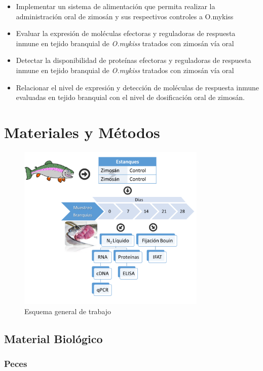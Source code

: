 \documentclass[12pt,a4paper,]{article}
\begin{document}
\begin{itemize}
\itemsep1pt\parskip0pt
\item
  Implementar un sistema de alimentación que permita realizar la
  administración oral de zimosán y sus respectivos controles a O.mykiss
\item
  Evaluar la expresión de moléculas efectoras y reguladoras de respuesta
  inmune en tejido branquial de \emph{O.mykiss} tratados con zimosán vía
  oral
\item
  Detectar la disponibilidad de proteínas efectoras y reguladoras de
  respuesta inmune en tejido branquial de \emph{O.mykiss} tratados con
  zimosán vía oral
\item
  Relacionar el nivel de expresión y detección de moléculas de respuesta
  inmune evaluadas en tejido branquial con el nivel de dosificación oral
  de zimosán.
\end{itemize}

\clearpage

\section{Materiales y Métodos}\label{materiales-y-muxe9todos}

\begin{figure}[h!]
    \centering
        \includegraphics[width=9cm]{esquema} 
    \caption {Esquema general de trabajo}
    \label {fig:esquema}
\end{figure}

\subsection{Material Biológico}\label{material-bioluxf3gico}

\subsubsection{Peces}\label{peces}
\end{document}
